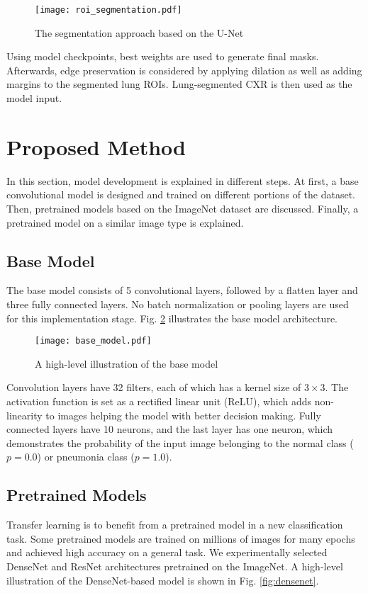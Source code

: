 \documentclass{article}
\begin{document}
\begin{figure}[H]
    \centering
    \texttt{[image: roi\_segmentation.pdf]}
    \caption{The segmentation approach based on the U-Net}
    \label{fig:segmentation}
\end{figure}

\noindent Using model checkpoints, best weights are used to generate final masks. Afterwards, edge preservation is considered by applying dilation as well as adding margins to the segmented lung ROIs. Lung-segmented CXR is then used as the model input.


\section{Proposed Method}
In this section, model development is explained in different steps. At first, a base convolutional model is designed and trained on different portions of the dataset. Then, pretrained models based on the ImageNet dataset are discussed. Finally, a pretrained model on a similar image type is explained. 

\subsection{Base Model} \label{base_model}
The base model consists of 5 convolutional layers, followed by a flatten layer and three fully connected layers. No batch normalization or pooling layers are used for this implementation stage. Fig. \ref{fig:base_model} illustrates the base model architecture.

\begin{figure}[H]
    \centering
    \texttt{[image: base\_model.pdf]}
    \caption{A high-level illustration of the base model}
    \label{fig:base_model}
\end{figure}

\noindent Convolution layers have 32 filters, each of which has a kernel size of $3\times3$. The activation function is set as a rectified linear unit (ReLU), which adds non-linearity to images helping the model with better decision making. Fully connected layers have 10 neurons, and the last layer has one neuron, which demonstrates the probability of the input image belonging to the normal class (\(p=0.0\)) or pneumonia class (\(p=1.0\)). 

\subsection{Pretrained Models}
Transfer learning is to benefit from a pretrained model in a new classification task. Some pretrained models are trained on millions of images for many epochs and achieved high accuracy on a general task. We experimentally selected DenseNet and ResNet architectures pretrained on the ImageNet. A high-level illustration of the DenseNet-based model is shown in Fig. \ref{fig:densenet}.
\end{document}
